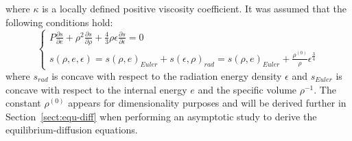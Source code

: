 \documentclass[review]{elsarticle}
\newcommand{\sect}[1]{Section~\ref{#1}}                     %
\begin{document}
where $\kappa$ is a locally defined positive viscosity coefficient. It was assumed that the following conditions hold:
\begin{equation}
\label{eq:equation7bis}
\left\{
\begin{array}{ll}
P \frac{\partial s}{\partial e} + \rho^2 \frac{\partial s}{\partial \rho} + \frac{4}{3} \rho \epsilon \frac{\partial s}{\partial \epsilon} = 0 \\
s( \rho, e, \epsilon) = s(\rho, e)_{Euler} + s(\epsilon, \rho)_{rad} = s(\rho, e)_{Euler} + \frac{\rho^{(0)}}{\rho} \epsilon^\frac{3}{4}
\end{array}
\right.
\end{equation}
where $s_{rad}$ is concave with respect to the radiation energy density $\epsilon$ and $s_{Euler}$ is concave with respect to the internal energy $e$ and the specific volume $\rho^{-1}$. The constant $\rho^{(0)}$ appears for dimensionality purposes and will be derived further in \sect{sect:equ-diff} when performing an asymptotic study to derive the equilibrium-diffusion equations. 
\end{document}
